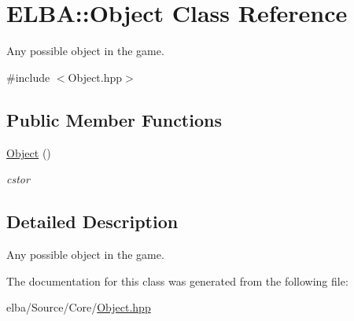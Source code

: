 \hypertarget{class_e_l_b_a_1_1_object}{}\section{E\+L\+BA\+:\+:Object Class Reference}
\label{class_e_l_b_a_1_1_object}


Any possible object in the game.  




{\ttfamily \#include $<$Object.\+hpp$>$}

\subsection*{Public Member Functions}
\begin{DoxyCompactItemize}
\item 
\mbox{\label{class_e_l_b_a_1_1_object_aa3abbb9687693d254ada1d0b6573c40e}} 
\mbox{\hyperlink{class_e_l_b_a_1_1_object_aa3abbb9687693d254ada1d0b6573c40e}{Object}} ()
\begin{DoxyCompactList}\small\item\em cstor \end{DoxyCompactList}\end{DoxyCompactItemize}


\subsection{Detailed Description}
Any possible object in the game. 

The documentation for this class was generated from the following file\+:\begin{DoxyCompactItemize}
\item 
elba/\+Source/\+Core/\mbox{\hyperlink{_object_8hpp}{Object.\+hpp}}\end{DoxyCompactItemize}
